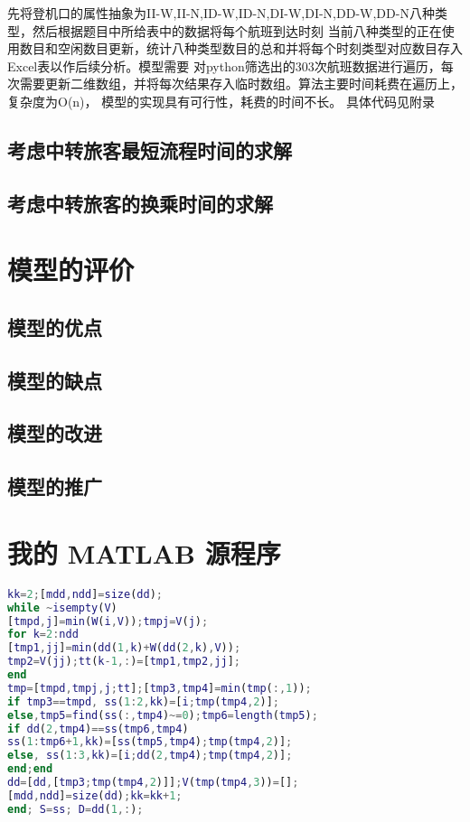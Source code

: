 \documentclass[bwprint]{gmcmthesis}
\begin{document}
先将登机口的属性抽象为II-W,II-N,ID-W,ID-N,DI-W,DI-N,DD-W,DD-N八种类型，然后根据题目中所给表中的数据将每个航班到达时刻
当前八种类型的正在使用数目和空闲数目更新，统计八种类型数目的总和并将每个时刻类型对应数目存入Excel表以作后续分析。模型需要
对python筛选出的303次航班数据进行遍历，每次需要更新二维数组，并将每次结果存入临时数组。算法主要时间耗费在遍历上，复杂度为O(n)，
模型的实现具有可行性，耗费的时间不长。
具体代码见附录


\subsection{考虑中转旅客最短流程时间的求解}
\subsection{考虑中转旅客的换乘时间的求解}
\section{模型的评价}
\subsection{模型的优点}

\subsection{模型的缺点}
\subsection{模型的改进}
\subsection{模型的推广}











\newpage
\appendix
\section{我的 MATLAB 源程序}
\begin{lstlisting}[language=Matlab]%设置不同语言即可。
kk=2;[mdd,ndd]=size(dd);
while ~isempty(V)
[tmpd,j]=min(W(i,V));tmpj=V(j);
for k=2:ndd
[tmp1,jj]=min(dd(1,k)+W(dd(2,k),V));
tmp2=V(jj);tt(k-1,:)=[tmp1,tmp2,jj];
end
tmp=[tmpd,tmpj,j;tt];[tmp3,tmp4]=min(tmp(:,1));
if tmp3==tmpd, ss(1:2,kk)=[i;tmp(tmp4,2)];
else,tmp5=find(ss(:,tmp4)~=0);tmp6=length(tmp5);
if dd(2,tmp4)==ss(tmp6,tmp4)
ss(1:tmp6+1,kk)=[ss(tmp5,tmp4);tmp(tmp4,2)];
else, ss(1:3,kk)=[i;dd(2,tmp4);tmp(tmp4,2)];
end;end
dd=[dd,[tmp3;tmp(tmp4,2)]];V(tmp(tmp4,3))=[];
[mdd,ndd]=size(dd);kk=kk+1;
end; S=ss; D=dd(1,:);


 \end{lstlisting}
\end{document}
